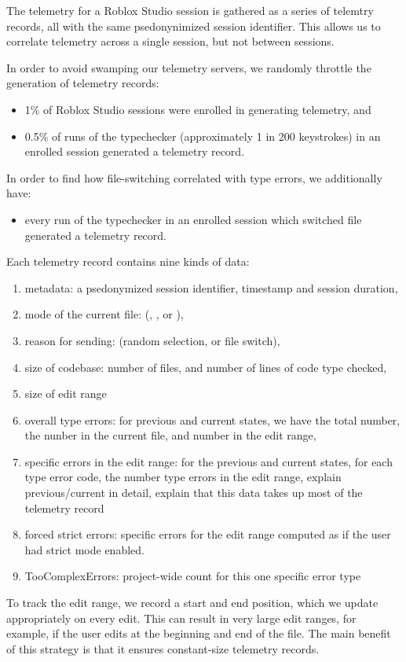 \documentclass[english,submission,cleveref]{programming}
\begin{document}
The telemetry for a Roblox Studio session is gathered as a series of
telemtry records, all with the same psedonynimized session
identifier. This allows us to correlate telemetry across a single
session, but not between sessions.

In order to avoid swamping our telemetry servers, we randomly throttle
the generation of telemetry records:
\begin{itemize}
  \item
    1\% of Roblox Studio sessions were enrolled in generating telemetry, and
  \item
    0.5\% of runs of the typechecker (approximately 1 in 200 keystrokes)
      in an enrolled session generated a telemetry record.
\end{itemize}
In order to find how file-switching correlated with type errors, we additionally have:
\begin{itemize}
  \item
    every run of the typechecker in an enrolled session which switched file generated a telemetry record.
\end{itemize}
Each telemetry record contains nine kinds of data:
\begin{enumerate}
  \item metadata: a psedonymized session identifier, timestamp and session duration,
  \item mode of the current file: (\mnocheck{}, \mnonstrict{}, or \mstrict{}),
  \item reason for sending: (random selection, or file switch),
  \item size of codebase: number of files, and number of lines of code type checked,
  \item size of edit range
  \item overall type errors: for previous and current states, we have the total number, the nunber in the current file, and number in the edit range,
  \item specific errors in the edit range: for the previous and current states, for each type error code, the number type errors in the edit range,
    \FILL{} explain previous/current in detail, explain that this data takes up most of the telemetry record
  \item forced strict errors: specific errors for the
    edit range computed as if the user had strict mode enabled.
  \item TooComplexErrors: project-wide count for this one specific error type
\end{enumerate}
To track the edit range, we record a start and end position, which we
update appropriately on every edit. This can result in very large edit
ranges, for example, if the user edits at the beginning and end of the
file.
The main benefit of this strategy is that it ensures constant-size telemetry records.
\end{document}
